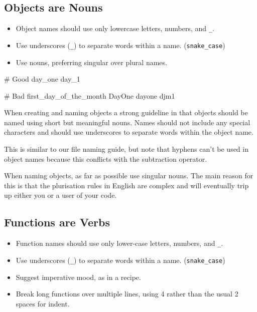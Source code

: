 \documentclass[
  letterpaper,
  DIV=11,
  numbers=noendperiod]{scrreprt}
\newenvironment{Shaded}{\begin{snugshade}}{\end{snugshade}}
\newcommand{\CommentTok}[1]{\textcolor[rgb]{0.37,0.37,0.37}{#1}}
\newcommand{\NormalTok}[1]{\textcolor[rgb]{0.00,0.23,0.31}{#1}}
\begin{document}
\subsection{Objects are Nouns}\label{objects-are-nouns}

\begin{itemize}
\item
  Object names should use only lowercase letters, numbers, and
  \texttt{\_}.
\item
  Use underscores (\texttt{\_}) to separate words within a name.
  (\texttt{snake\_case})
\item
  Use nouns, preferring singular over plural names.
\end{itemize}

\begin{Shaded}
\begin{Highlighting}[]
\CommentTok{\# Good}
\NormalTok{day\_one}
\NormalTok{day\_1}

\CommentTok{\# Bad}
\NormalTok{first\_day\_of\_the\_month}
\NormalTok{DayOne}
\NormalTok{dayone}
\NormalTok{djm1}
\end{Highlighting}
\end{Shaded}

When creating and naming objects a strong guideline in that objects
should be named using short but meaningful nouns. Names should not
include any special characters and should use underscores to separate
words within the object name.

This is similar to our file naming guide, but note that hyphens can't be
used in object names because this conflicts with the subtraction
operator.

When naming objects, as far as possible use singular nouns. The main
reason for this is that the plurisation rules in English are complex and
will eventually trip up either you or a user of your code.

\subsection{Functions are Verbs}\label{functions-are-verbs}

\begin{itemize}
\item
  Function names should use only lower-case letters, numbers, and
  \texttt{\_}.
\item
  Use underscores (\texttt{\_}) to separate words within a name.
  (\texttt{snake\_case})
\item
  Suggest imperative mood, as in a recipe.
\item
  Break long functions over multiple lines, using 4 rather than the
  usual 2 spaces for indent.
\end{itemize}
\end{document}
